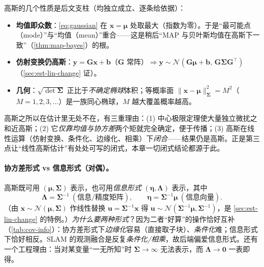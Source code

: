 \noindent 高斯的几个性质是后文支柱（均独立成立、逐条给依据）：
\begin{itemize}
  \item \textbf{均值即众数}：\cref{eq:gaussian} 在 $\mathbf{x}=\boldsymbol{\mu}$ 处取最大（指数为零）。于是“最可能点（mode）”与“均值（mean）”重合——这是稍后“MAP 与贝叶斯均值在高斯下一致”（\cref{thm:map-bayes}）的根。
  \item \textbf{仿射变换仍高斯}：$\mathbf{y}=\mathbf{G}\mathbf{x}+\mathbf{b}$（$\mathbf{G}$ 常阵）$\Rightarrow\mathbf{y}\sim\mathcal{N}(\mathbf{G}\boldsymbol{\mu}+\mathbf{b},\,\mathbf{G}\boldsymbol{\Sigma}\mathbf{G}^\top)$（\cref{sec:est-lin-change} 证）。
  \item \textbf{几何}：$\sqrt{\det\boldsymbol{\Sigma}}$ 正比于\emph{不确定椭球}体积；等概率面 $\|\mathbf{x}-\boldsymbol{\mu}\|_{\boldsymbol{\Sigma}}^2=M^2$（$M=1,2,3,\dots$）是一族同心椭球，$M$ 越大覆盖概率越高。
\end{itemize}

\begin{insight}
高斯之所以在估计里无处不在，有三重理由：(1) 中心极限定理使大量独立微扰之和近高斯；(2) 它\emph{仅靠均值与协方差}两个矩就完全确定，便于传播；(3) 高斯在线性运算（仿射变换、条件化、边缘化、相乘）下\emph{闭合}——结果仍是高斯。正是第三点让“线性高斯估计”有处处可写的闭式，本章一切闭式结论都源于此。
\end{insight}

\paragraph{协方差形式 vs 信息形式（对偶）。}
高斯既可用 $(\boldsymbol{\mu},\boldsymbol{\Sigma})$ 表示，也可用\emph{信息形式} $(\boldsymbol{\eta},\boldsymbol{\Lambda})$ 表示，其中
\begin{equation}
  \boldsymbol{\Lambda}=\boldsymbol{\Sigma}^{-1}\ (\text{信息/精度矩阵}),\qquad
  \boldsymbol{\eta}=\boldsymbol{\Sigma}^{-1}\boldsymbol{\mu}\ (\text{信息向量}).
  \label{eq:info-form}
\end{equation}
（由 $\mathbf{x}\sim\mathcal{N}(\boldsymbol{\mu},\boldsymbol{\Sigma})$ 作线性替换 $\mathbf{u}=\boldsymbol{\Sigma}^{-1}\mathbf{x}$ 得 $\mathbf{u}\sim\mathcal{N}(\boldsymbol{\Sigma}^{-1}\boldsymbol{\mu},\boldsymbol{\Sigma}^{-1})$，是 \cref{sec:est-lin-change} 的特例。）\emph{为什么要两种形式}？因为二者“好算”的操作恰好互补（\cref{tab:cov-info}）：协方差形式下\emph{边缘化}容易（直接取子块）、\emph{条件化}难；信息形式下恰好相反。SLAM 的观测融合是反复\emph{条件化/相乘}，故后端偏爱信息形式。还有一个工程理由：当对某变量“一无所知”时 $\boldsymbol{\Sigma}\to\infty$ 无法表示，而 $\boldsymbol{\Lambda}\to\mathbf{0}$ 一表即得。

